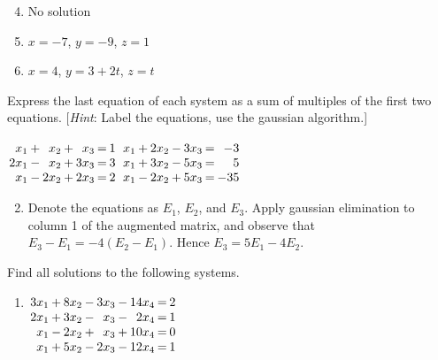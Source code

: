 \begin{multicols}{2}
\begin{ex}
\begin{sol}
\begin{enumerate}[label={\alph*.}]
\setcounter{enumi}{3}
\item  No solution

\setcounter{enumi}{5}
\item  $x = -7$, $y = -9$, $z = 1$

\setcounter{enumi}{7}
\item  $x = 4$, $y = 3 + 2t$, $z = t$

\end{enumerate}
\end{sol}
\end{ex}

\begin{ex}
Express the last equation of each system as a sum of multiples of the first two equations. [\textit{Hint}: Label the equations, use the gaussian algorithm.]

\begin{exenumerate}
\exitem 
$\arraycolsep=1pt
\begin{array}[t]{rlrlrcr}
 	 x_1 & + & x_2 & + &  x_3 & = & 1 \\
	2x_1 & - & x_2 & + & 3x_3 & = & 3 \\
	 x_1 & - & 2x_2& + & 2x_3 & = & 2
\end{array}$
\exitem 
$\arraycolsep=1pt
\begin{array}[t]{rlrlrcr}
	 x_1 & + & 2x_2 & - & 3x_3 & = & -3 \\
	 x_1 & + & 3x_2 & - & 5x_3 & = & 5 \\
	 x_1 & - & 2x_2 & + & 5x_3 & = & -35
\end{array}$
\end{exenumerate}
\begin{sol}
\begin{enumerate}[label={\alph*.}]
\setcounter{enumi}{1}
\item  Denote the equations as $E_1$, $E_2$, and $E_3$. Apply gaussian elimination to column 1 of the augmented matrix, and observe that $E_3 - E_1 = -4(E_2 - E_1)$. Hence $E_3 = 5 E_1 - 4 E_2$.

\end{enumerate}
\end{sol}
\end{ex}

\begin{ex} %
Find all solutions to the following systems.

\begin{enumerate}[label={\alph*.}]
\item 
$\arraycolsep=1pt
\begin{array}[t]{rlrlrlrcr}
	3x_1 & + & 8x_2 & - & 3x_3 & - & 14x_4 & = & 2 \\
	2x_1 & + & 3x_2 & - &  x_3 & - &  2x_4 & = & 1 \\
	 x_1 & - & 2x_2 & + &  x_3 & + & 10x_4 & = & 0 \\
	 x_1 & + & 5x_2 & - & 2x_3 & - & 12x_4 & = & 1 \\
\end{array}$


\end{enumerate}
\end{ex}
\end{multicols}
